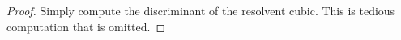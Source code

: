 \begin{proof}
    Simply compute the discriminant of the resolvent cubic.
    This is tedious computation that is omitted.
\end{proof}

